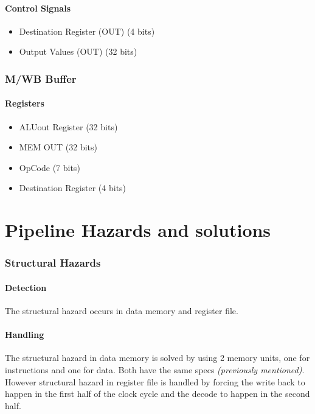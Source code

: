 \documentclass[12pt]{report}
\begin{document}
\subsection{Control Signals}
\begin{itemize}
    \item Destination Register (OUT) (4 bits)
    \item Output Values (OUT) (32 bits)
\end{itemize}

\section{M/WB Buffer}

\subsection{Registers}
\begin{itemize}
    \item ALUout Register (32 bits)
    \item MEM OUT (32 bits)
    \item OpCode (7 bits)
    \item Destination Register (4 bits)
\end{itemize}

\part{Pipeline Hazards and solutions}

\section{Structural Hazards}

\subsection{Detection}
The structural hazard occurs in data memory and register file.

\subsection{Handling}
The structural hazard in data memory is solved by using 2 memory units, one for instructions and one for data. Both have the same specs \emph{(previously mentioned)}. \\
However structural hazard in register file is handled by forcing the write back to happen in the first half of the clock cycle and the decode to happen in the second half.
\end{document}
